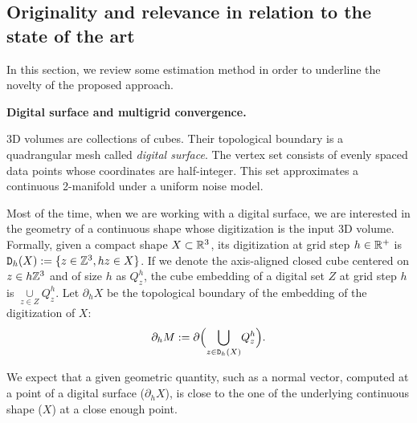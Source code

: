 

\subsection{Originality and relevance in relation to the state of the art}


In this section, we review some estimation method in order to underline the novelty of the proposed approach. 

\noindent\textbf{Digital surface and multigrid convergence.}

3D volumes are collections of cubes. %
Their topological boundary is a quadrangular mesh called \emph{digital surface}.
The vertex set consists of evenly spaced data points whose coordinates are
half-integer. This set approximates a continuous 2-manifold under a uniform
noise model. 

Most of the time, when we are working with a digital surface, we are 
interested in the geometry of a continuous shape whose digitization
is the input 3D volume.
Formally, given a compact shape $X \subset {\ensuremath\mathbb{R}}^3$,
its digitization at grid step $h \in {\ensuremath\mathbb{R}}^+$ is ${\mathtt{D}_h}(X) := \{z \in {\ensuremath\mathbb{Z}}^3, hz \in X\}$.
If we denote the axis-aligned closed cube centered on $z \in h{\mathbb{Z}}^3$ and of size $h$ as $Q_z^h$,
the cube embedding of a digital set $Z$ at grid step $h$ is $\underset{z\in Z}{\cup}Q_z^h$.
Let $\partial_h X$ be the topological boundary of the embedding of the digitization of $X$: 
\[
\partial_h M := \partial \Big( \underset{z\in{\ensuremath\mathtt{D}_h}(X)}{\bigcup}Q_z^h \Big).
\]

We expect that a given geometric quantity, such as a normal vector,
computed at a point of a digital surface ($\partial_h X$),
is close to the one of the underlying continuous shape ($X$) at a close enough point. 

